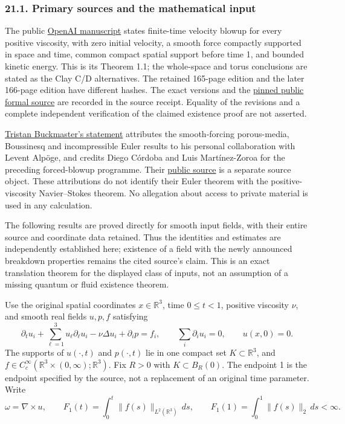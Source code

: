 \documentclass[
  11pt,
]{article}
\begin{document}
\subsubsection{21.1. Primary sources and the mathematical
input}\label{primary-sources-and-the-mathematical-input}

The public
\href{https://cdn.openai.com/pdf/32d9f210-8b73-45e0-91bc-82a30aef8a9a/navier-stokes.pdf}{OpenAI
manuscript} states finite-time velocity blowup for every positive
viscosity, with zero initial velocity, a smooth force compactly
supported in space and time, common compact spatial support before time
1, and bounded kinetic energy. This is its Theorem 1.1; the whole-space
and torus conclusions are stated as the Clay C/D alternatives. The
retained 165-page edition and the later 166-page edition have different
hashes. The exact versions and the
\href{https://github.com/openai/NavierStokesAndEuler/tree/8937a8f4cbc7abaab5e9e97d1cc7f5d2319d9538}{pinned
public formal source} are recorded in the source receipt. Equality of
the revisions and a complete independent verification of the claimed
existence proof are not asserted.

\href{https://cims.nyu.edu/~tristanb/statement.pdf}{Tristan Buckmaster's
statement} attributes the smooth-forcing porous-media, Boussinesq and
incompressible Euler results to his personal collaboration with Levent
Alpöge, and credits Diego Córdoba and Luis Martínez-Zoroa for the
preceding forced-blowup programme. Their
\href{https://github.com/tristanbuckmaster/fluid_lean}{public source} is
a separate source object. These attributions do not identify their Euler
theorem with the positive-viscosity Navier--Stokes theorem. No
allegation about access to private material is used in any calculation.

The following results are proved directly for smooth input fields, with
their entire source and coordinate data retained. Thus the identities
and estimates are independently established here; existence of a field
with the newly announced breakdown properties remains the cited source's
claim. This is an exact translation theorem for the displayed class of
inputs, not an assumption of a missing quantum or fluid existence
theorem.

Use the original spatial coordinates \(x\in\mathbb R^3\), time
\(0\le t<1\), positive viscosity \(\nu\), and smooth real fields
\(u,p,f\) satisfying \[
 \partial_tu_i+\sum_{\ell=1}^3u_\ell\partial_\ell u_i
 -\nu\Delta u_i+\partial_i p=f_i,\qquad
 \sum_i\partial_i u_i=0,\qquad u(x,0)=0.
 \tag{257}
\] The supports of \(u(\cdot,t)\) and \(p(\cdot,t)\) lie in one compact
set \(K\subset\mathbb R^3\), and
\(f\in C_c^\infty(\mathbb R^3\times(0,\infty);\mathbb R^3)\). Fix
\(R>0\) with \(K\subset B_R(0)\). The endpoint 1 is the endpoint
specified by the source, not a replacement of an original time
parameter. Write \[
 \omega=\nabla\times u,\qquad
 F_1(t)=\int_0^t\|f(s)\|_{L^2(\mathbb R^3)}\,ds,\qquad
 F_1(1)=\int_0^1\|f(s)\|_2\,ds<\infty .
 \tag{258}
\]
\end{document}
